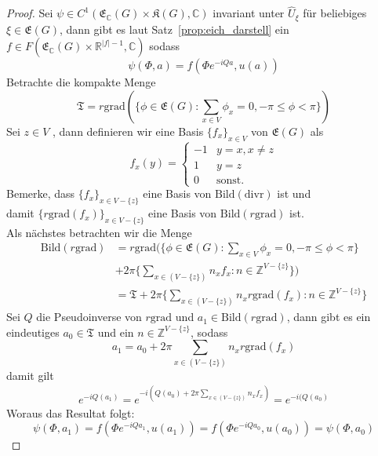 \documentclass[11pt,a4paper,leqno]{report}
\numberwithin{equation}{chapter}
\begin{document}
\begin{proof} 
	Sei $\psi\in C^1(\mathfrak{E}_\mathbb{C}(G)\times\mathfrak{K}(G), \mathbb{C})$ invariant unter $\hat{U}_\xi$ f\"ur beliebiges $\xi\in\mathfrak{E}(G)$, dann gibt es laut
	Satz~\ref{prop:eich_darstell} ein $f\in F(\mathfrak{E}_\mathbb{C}(G)\times\mathbb{R}^{|f|-1}, \mathbb{C})$ sodass
	\[
	\psi(\Phi, a) = f(\Phi e^{-iQa}, u(a))
	\]
Betrachte die kompakte Menge
	\begin{equation}
		\mathfrak{T} = r\mathrm{grad}(\{\phi\in\mathfrak{E}(G):\sum_{x\in V}\phi_x=0, -\pi\leq\phi<\pi\})
	\end{equation}
Sei $z \in V$ , dann definieren wir eine Basis $\{f_x\}_{x\in V}$ von $\mathfrak{E}(G)$ als
\begin{equation}
	f_x(y)=\begin{cases} 
		-1 & y=x, x\neq z \\
		1 & y=z \\
		0 & \text{sonst. } 
	\end{cases}
\end{equation}
Bemerke, dass $\{f_x\}_{x\in V-\{z\}}$ eine Basis von $\mathrm{Bild}(\mathrm{div r})$ ist und \\damit $\{r\mathrm{grad}(f_x)\}_{x\in V-\{z\}}$ eine Basis von $\mathrm{Bild}(r\mathrm{grad})$ ist.\\
Als n\"achstes betrachten wir die Menge
\begin{align*}
\mathrm{Bild}(r\mathrm{grad}) &= r\mathrm{grad}(\{\phi\in\mathfrak{E}(G):\sum_{x\in V}\phi_x=0, -\pi\leq\phi<\pi\} \\&+ 2\pi\{\sum_{x\in(V-\{z\})}n_x f_x: n\in \mathbb{Z}^{V-\{z\}}\})\\
&=\mathfrak{T} + 2\pi\{\sum_{x\in(V-\{z\})}n_x r\mathrm{grad}(f_x): n\in \mathbb{Z}^{V-\{z\}}\}
\end{align*}
Sei $Q$ die Pseudoinverse von $r\mathrm{grad}$ und $a_1\in\mathrm{Bild}(r\mathrm{grad})$, dann gibt es ein eindeutiges $a_0\in \mathfrak{T}$ und ein $n\in \mathbb{Z}^{V-\{z\}}$, sodass
\begin{equation}
	a_1 = a_0 + 2\pi \sum_{x\in(V-\{z\})}n_x r\mathrm{grad}(f_x)
\end{equation}
damit gilt
\begin{align*}
	e^{-iQ(a_1)}=e^{-i(Q(a_0) + 2\pi \sum_{x\in(V-\{z\})}n_xf_x)}=e^{-i(Q(a_0)}
\end{align*}
Woraus das Resultat folgt:
\[
\psi(\Phi, a_1) = f(\Phi e^{-iQa_1}, u(a_1))=f(\Phi e^{-iQa_0}, u(a_0))=\psi(\Phi, a_0)
\]
\end{proof}
\end{document}
